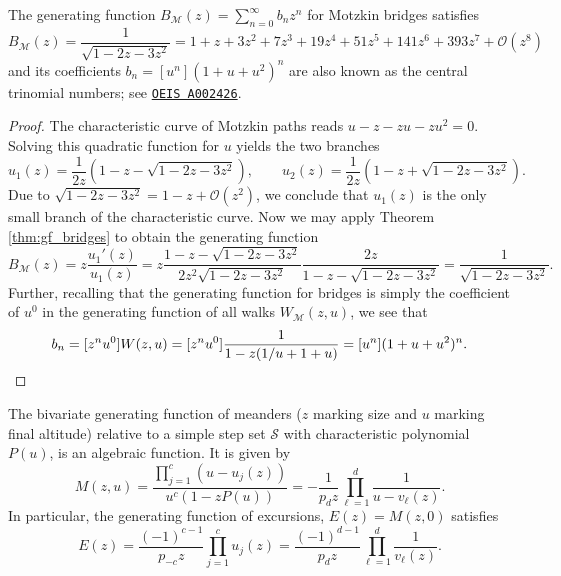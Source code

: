 \begin{corollary}
  The generating function $B_{\mathcal{M}}(z) = \sum_{n = 0}^\infty b_nz^n$ for Motzkin bridges satisfies
  $$
    B_{\mathcal{M}}(z) = \frac{1}{\sqrt{1 - 2z -  3z^2}} = 1 + z + 3z^2 + 7z^3 + 19z^4 + 51z^5 + 141z^6 + 393z^7 + \mathcal{O}(z^8)
  $$ 
  and its coefficients $b_n = [u^n](1+u+u^2)^n$ are also known as the
  central trinomial numbers; see \href{https://oeis.org/A002426}{\texttt{OEIS A002426}}.
\end{corollary}

\begin{proof}
  The characteristic curve of Motzkin paths reads $u - z - zu - zu^{2} = 0$.
  Solving this quadratic function for $u$ yields the two branches
  \begin{equation*} 
    u_1(z) = \frac{1}{2z}\left(1 - z - \sqrt{1-2z-3z^{2}}\right), \qquad 
    u_2(z) = \frac{1}{2z}\left(1 - z + \sqrt{1-2z-3z^{2}}\right). 
  \end{equation*}
  Due to $\sqrt{1-2z-3z^{2}} = 1 - z + \mathcal{O}(z^2)$, we conclude that $u_1(z)$ is the only small branch of the characteristic curve.
  Now we may apply Theorem \ref{thm:gf_bridges} to obtain the generating function 
  \begin{equation*} 
    B_\mathcal{M}(z) = z\frac{u_1'(z)}{u_{1}(z)}
    = z\frac{1-z-\sqrt{1-2z-3z^{2}}}{2z^{2}\sqrt{1-2z-3z^{2}}} \frac{2z}{1-z-\sqrt{1-2z-3z^{2}}} 
    = \frac{1}{\sqrt{1-2z-3z^{2}}}.
  \end{equation*}
  Further, recalling that the generating function for bridges is simply the coefficient of $u^0$ in the generating function of all walks $W_{\mathcal{M}}(z,u)$, we see that
  \begin{equation*}
    b_n = [z^n u^0] W(z,u) = [z^n u^0] \frac{1}{1 - z(1/u + 1 + u)}
    = [u^n] (1 + u + u^2)^n. \qedhere
  \end{equation*}
\end{proof}

\begin{theorem}
\label{thm:gf_meanders_excursions}
  The bivariate generating function of meanders ($z$ marking size and $u$ marking final altitude) relative to a simple step set $\mathcal{S}$ with characteristic polynomial $P(u)$, is an algebraic function. It is given by
  \begin{equation} \label{eq:gf_meanders}
    M(z,u) = \frac{\prod_{j=1}^c (u - u_j(z))}{u^c(1-zP(u))} = -\frac{1}{p_dz} \prod_{\ell = 1}^d \frac{1}{u - v_\ell(z)}.
  \end{equation}
  In particular, the generating function of excursions, $E(z) = M(z,0)$ satisfies
  \begin{equation} \label{eq:gf_excursions}
    E(z) = \frac{(-1)^{c-1}}{p_{-c}z}
    \prod_{j=1}^c u_j(z) = \frac{(-1)^{d-1}}{p_dz} \prod_{\ell=1}^d \frac{1}{v_\ell(z)}.
  \end{equation}
\end{theorem}

